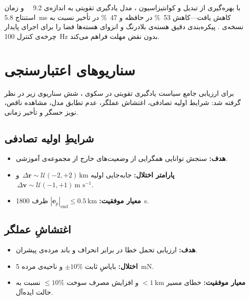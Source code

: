 	با بهره‌گیری از تبدیل  و کوانتیزاسیون ، مدل یادگیری تقویتی به اندازه‌ی \SI{9.2}{\mega\byte} و زمان استنتاج \SI{5.8}{\milli\second} کاهش یافت—کاهش \SI{53}{\percent} در حافظه و \SI{47}{\percent} در تأخیر نسبت به نسخه‌ی . پیکره‌بندی دقیق هسته‌ی بلادرنگ و انزوا‌ی هسته‌ها فضا را برای اجرای پایدار چرخه‌ی کنترل \SI{100}{\hertz} بدون نقض مهلت فراهم می‌کند.
	
	
	\section{سناریوهای اعتبارسنجی}\label{sec:hil_validation}
	
برای ارزیابی جامع سیاست یادگیری تقویتی در سکوی ، شش سناریوی زیر در نظر گرفته شد: شرایط اولیه تصادفی، اغتشاش عملگر، عدم تطابق مدل، مشاهده ناقص، نویز حسگر و تأخیر زمانی.
	
	\subsection{
		شرایطِ اولیه تصادفی}\label{subsec:scn_ic}
	\begin{itemize}
		\item \textbf{هدف:} سنجش توانایی همگرایی از وضعیت‌های خارج از مجموعه‌ی آموزشی.
		\item \textbf{پارامتر اختلال:} جابه‌جایی اولیه $\,\Delta\mathbf{r}\sim\mathcal{U}(-2,+2)\,\text{km}$ و $\,\Delta\mathbf{v}\sim\mathcal{U}(-1,+1)\,\text{m s}^{-1}$.
		\item \textbf{معیار موفقیت:} $|\boldsymbol{e}_{p}|_{\text{end}}\le\SI{0.5}{\kilo\meter}$ ظرف \SI{1800}{\second}.
	\end{itemize}
	
	\subsection{
		اغتشاشِ عملگر}\label{subsec:scn_act}
	\begin{itemize}
		\item \textbf{هدف:} ارزیابی تحمل خطا در برابر انحراف و باند مرده‌ی پیشران.
		\item \textbf{اختلال:} بایاسِ ثابت $\pm10\%$ و ناحیه‌ی مرده \SI{5}{\milli\newton}.
		\item \textbf{معیار موفقیت:} خطای مسیر $<\SI{1}{\kilo\meter}$ و افزایش مصرف سوخت $\le10\%$ نسبت به حالت ایده‌آل.
	\end{itemize}
	
